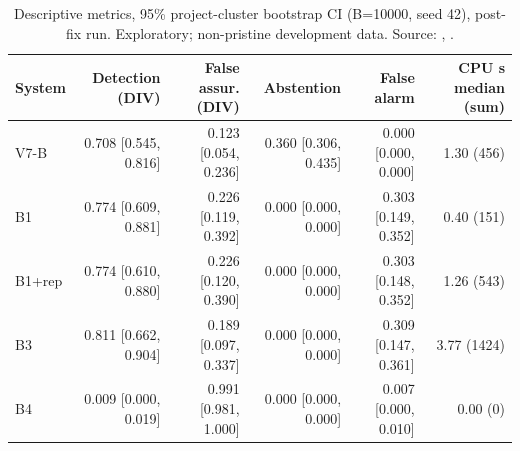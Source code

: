 \begin{table}[t]
\centering\scriptsize
\caption{Descriptive metrics, 95\% project-cluster bootstrap CI (B=10000, seed 42), post-fix run. Exploratory; non-pristine development data. Source: , .}
\label{tab:metrics}
\begin{tabular}{lrrrrr}
\hline
System & Detection (DIV) & False assur. (DIV) & Abstention & False alarm & CPU s median (sum) \\
\hline
V7-B & 0.708 [0.545, 0.816] & 0.123 [0.054, 0.236] & 0.360 [0.306, 0.435] & 0.000 [0.000, 0.000] & 1.30 (456) \\
B1 & 0.774 [0.609, 0.881] & 0.226 [0.119, 0.392] & 0.000 [0.000, 0.000] & 0.303 [0.149, 0.352] & 0.40 (151) \\
B1+rep & 0.774 [0.610, 0.880] & 0.226 [0.120, 0.390] & 0.000 [0.000, 0.000] & 0.303 [0.148, 0.352] & 1.26 (543) \\
B3 & 0.811 [0.662, 0.904] & 0.189 [0.097, 0.337] & 0.000 [0.000, 0.000] & 0.309 [0.147, 0.361] & 3.77 (1424) \\
B4 & 0.009 [0.000, 0.019] & 0.991 [0.981, 1.000] & 0.000 [0.000, 0.000] & 0.007 [0.000, 0.010] & 0.00 (0) \\
\hline
\end{tabular}
\end{table}
